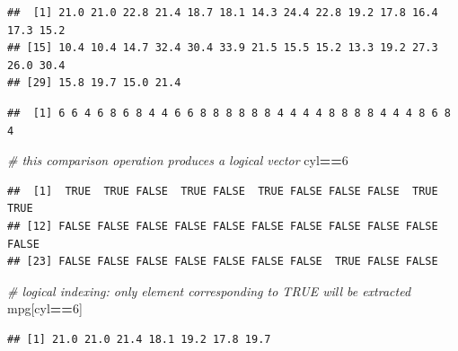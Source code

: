 \documentclass[]{book}
\newenvironment{Shaded}{\begin{snugshade}}{\end{snugshade}}
\newcommand{\CommentTok}[1]{\textcolor[rgb]{0.56,0.35,0.01}{\textit{#1}}}
\newcommand{\DecValTok}[1]{\textcolor[rgb]{0.00,0.00,0.81}{#1}}
\newcommand{\NormalTok}[1]{#1}
\newcommand{\OperatorTok}[1]{\textcolor[rgb]{0.81,0.36,0.00}{\textbf{#1}}}
\newcommand{\StringTok}[1]{\textcolor[rgb]{0.31,0.60,0.02}{#1}}
\begin{document}
\begin{Shaded}
\end{Shaded}

\begin{verbatim}
##  [1] 21.0 21.0 22.8 21.4 18.7 18.1 14.3 24.4 22.8 19.2 17.8 16.4 17.3 15.2
## [15] 10.4 10.4 14.7 32.4 30.4 33.9 21.5 15.5 15.2 13.3 19.2 27.3 26.0 30.4
## [29] 15.8 19.7 15.0 21.4
\end{verbatim}

\begin{Shaded}
\end{Shaded}

\begin{verbatim}
##  [1] 6 6 4 6 8 6 8 4 4 6 6 8 8 8 8 8 8 4 4 4 4 8 8 8 8 4 4 4 8 6 8 4
\end{verbatim}

\begin{Shaded}
\begin{Highlighting}[]
\CommentTok{# this comparison operation produces a logical vector}
\NormalTok{cyl}\OperatorTok{==}\DecValTok{6}
\end{Highlighting}
\end{Shaded}

\begin{verbatim}
##  [1]  TRUE  TRUE FALSE  TRUE FALSE  TRUE FALSE FALSE FALSE  TRUE  TRUE
## [12] FALSE FALSE FALSE FALSE FALSE FALSE FALSE FALSE FALSE FALSE FALSE
## [23] FALSE FALSE FALSE FALSE FALSE FALSE FALSE  TRUE FALSE FALSE
\end{verbatim}

\begin{Shaded}
\begin{Highlighting}[]
\CommentTok{# logical indexing: only element corresponding to TRUE will be extracted}
\NormalTok{mpg[cyl}\OperatorTok{==}\DecValTok{6}\NormalTok{]}
\end{Highlighting}
\end{Shaded}

\begin{verbatim}
## [1] 21.0 21.0 21.4 18.1 19.2 17.8 19.7
\end{verbatim}
\end{document}
